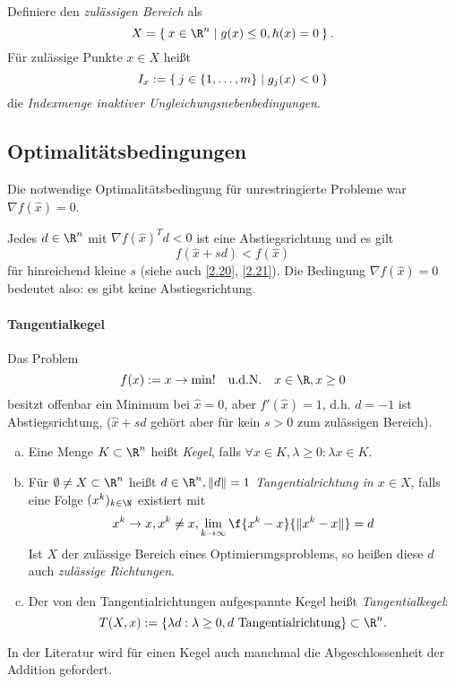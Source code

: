 \begin{df} \label{3.11}
	Definiere den \emph{zulässigen Bereich} als
	\[
		X = \Set{ x \in \R^n | g(x) \le 0, h(x) = 0 }.
	\]
	Für zulässige Punkte $x \in X$ heißt
	\[
		I_x := \Set{ j \in \{1, \dotsc, m\} | g_j(x) < 0 }
	\]
	die \emph{Indexmenge inaktiver Ungleichungsnebenbedingungen}.
\end{df}

\subsection{Optimalitätsbedingungen}

Die notwendige Optimalitätsbedingung für unrestringierte Probleme war $\nabla f(\hat x) = 0$.

Jedes $d \in \R^n$ mit $\nabla f(\hat x)^T d < 0$ ist eine Abstiegsrichtung und es gilt
\[
	f(\hat x + sd) < f(\hat x)
\]
für hinreichend kleine $s$ (siehe auch \ref{2.20}, \ref{2.21}).
Die Bedingung $\nabla f(\hat x) = 0$ bedeutet also: es gibt keine Abstiegsrichtung.

\paragraph{Tangentialkegel}

\begin{ex} \label{3.12}
	Das Problem
	\[
		f(x) := x \to \min! \udN  x\in \R, x \ge 0
	\]
	besitzt offenbar ein Minimum bei $\hat x = 0$, aber $f'(\hat x) = 1$, d.h. $d = -1$ ist Abstiegsrichtung, ($\hat x + sd$ gehört aber für kein $s > 0$ zum zulässigen Bereich).
\end{ex}

\begin{df} \label{3.13}
	\begin{enumerate}[(a)]
		\item
			Eine Menge $K \subset \R^n$ heißt \emph{Kegel}, falls $\forall x \in K, \lambda \ge 0 : \lambda x \in K$.
		\item
			Für $\emptyset \neq X \subset \R^n$ heißt $d \in \R^n, \|d\| = 1$ \emph{Tangentialrichtung in $x \in X$}, falls eine Folge $(x^k)_{k\in\N}$ existiert mit
			\[
				x^k \to x, x^k \neq x, \lim_{k\to\infty} \f{x^k - x}{\|x^k-x\|} = d
			\]
			Ist $X$ der zulässige Bereich eines Optimierungsproblems, so heißen diese $d$ auch \emph{zulässige Richtungen}.
		\item
			Der von den Tangentialrichtungen aufgespannte Kegel heißt \emph{Tangentialkegel}:
			\[
				T(X, x) := \{ \lambda d : \lambda \ge 0, d \text{ Tangentialrichtung} \} \subset \R^n.
			\]
	\end{enumerate}
	\begin{note}
		In der Literatur wird für einen Kegel auch manchmal die Abgeschlossenheit der Addition gefordert.
	\end{note}
\end{df}

